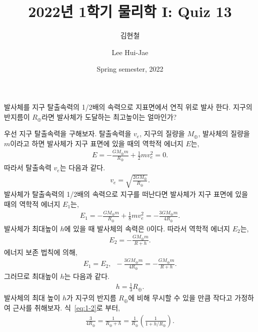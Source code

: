 \documentclass[floatfix,nofootinbib,superscriptaddress,fleqn]{revtex4-2}
\begin{document}
\title{\Large 2022년 1학기 물리학 I: Quiz 13}
\author{김현철} 
\author{Lee Hui-Jae} 
\date{Spring semester, 2022}


\vspace{1.cm}

\maketitle


발사체를 지구 탈출속력의 1/2배의 속력으로 지표면에서 연직 위로 발사
한다. 지구의 반지름이 $R_{\oplus}$라면 발사체가 도달하는 최고높이는
얼마인가? 

우선 지구 탈출속력을 구해보자. 탈출속력을 $v_e$, 지구의 질량을 $M_\oplus$, 
발사체의 질량을 $m$이라고 하면 발사체가 지구 표면에 있을 때의 역학적 에너지 $E$는,
\begin{align}
    E = -\frac{GM_\oplus m}{R_\oplus} + \frac{1}{2}mv^2_e=0.
\end{align}
따라서 탈출속력 $v_e$는 다음과 같다.
\begin{align}
    v_e = \sqrt{\frac{2GM_\oplus}{R_\oplus}}.
\end{align}
발사체가 탈출속력의 1/2배의 속력으로 지구를 떠난다면 발사체가 지구 표면에 있을 때의 
역학적 에너지 $E_1$는,
\begin{align}
    E_1 = -\frac{GM_\oplus m}{R_\oplus} + \frac{1}{8}mv_e^2
    =-\frac{3GM_\oplus m}{4R_\oplus}.
\end{align}
발사체가 최대높이 $h$에 있을 때 발사체의 속력은 0이다. 따라서 역학적 에너지 $E_2$는,
\begin{align}
    E_2 = -\frac{GM_\oplus m}{R+h}.
\end{align}
에너지 보존 법칙에 의해,
\begin{align}\label{eq:1-2}
    E_1 =E_2,\,\,\,
    -\frac{3GM_\oplus m}{4R_\oplus}=-\frac{GM_\oplus m}{R+h}.
\end{align}
그러므로 최대높이 $h$는 다음과 같다.
\begin{align}
    h = \frac{1}{3}R_\oplus.
\end{align}
발사체의 최대 높이 $h$가 지구의 반지름 $R_\oplus$에 비해 무시할 수 있을 만큼 
작다고 가정하여 근사를 취해보자. 식~\eqref{eq:1-2}로 부터,
\begin{align}\label{eq:1-3}
    \frac{3}{4R_\oplus}=\frac{1}{R_\oplus+h}
    =\frac{1}{R_\oplus}\left(\frac{1}{1+h/R_\oplus}\right).
\end{align}
\end{document}
